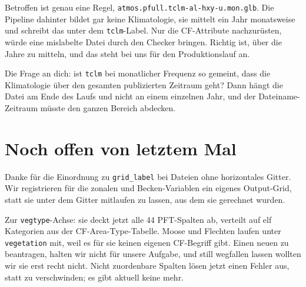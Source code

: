\documentclass[11pt,a4paper]{article}
\newcommand{\code}[1]{\texttt{\small #1}}
\begin{document}
Betroffen ist genau eine Regel, \code{atmos.pfull.tclm-al-hxy-u.mon.glb}. Die
Pipeline dahinter bildet gar keine Klimatologie, sie mittelt ein Jahr monatsweise
und schreibt das unter dem \code{tclm}-Label. Nur die CF-Attribute
nachzur\"usten, w\"urde eine mislabelte Datei durch den Checker bringen. Richtig
ist, \"uber die Jahre zu mitteln, und das steht bei uns f\"ur den
Produktionslauf an.

Die Frage an dich: ist \code{tclm} bei monatlicher Frequenz so gemeint, dass die
Klimatologie \"uber den gesamten publizierten Zeitraum geht? Dann h\"angt die
Datei am Ende des Laufs und nicht an einem einzelnen Jahr, und der
Dateiname-Zeitraum m\"usste den ganzen Bereich abdecken.

\section{Noch offen von letztem Mal}

Danke f\"ur die Einordnung zu \code{grid\_label} bei Dateien ohne horizontales
Gitter. Wir registrieren f\"ur die zonalen und Becken-Variablen ein eigenes
Output-Grid, statt sie unter dem Gitter mitlaufen zu lassen, aus dem sie
gerechnet wurden.

Zur \code{vegtype}-Achse: sie deckt jetzt alle 44 PFT-Spalten ab, verteilt auf
elf Kategorien aus der CF-Area-Type-Tabelle. Moose und Flechten laufen unter
\code{vegetation} mit, weil es f\"ur sie keinen eigenen CF-Begriff gibt. Einen
neuen zu beantragen, halten wir nicht f\"ur unsere Aufgabe, und still wegfallen
lassen wollten wir sie erst recht nicht. Nicht zuordenbare Spalten l\"osen jetzt
einen Fehler aus, statt zu verschwinden; es gibt aktuell keine mehr.
\end{document}
